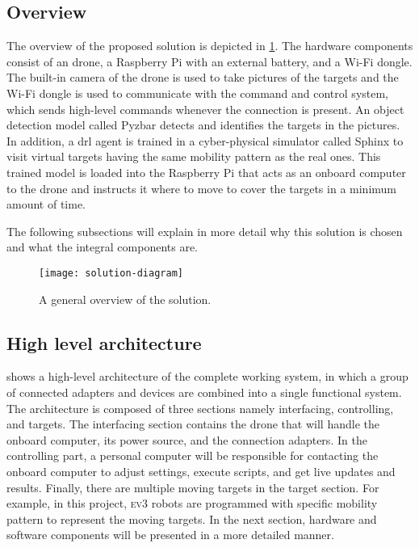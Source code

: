 \documentclass[../main.tex]{subfiles}
\begin{document}
\subsection{Overview}

The overview of the proposed solution is depicted in 
\cref{fig:solution-overview}. 
The hardware components consist of an \anafi drone,
a Raspberry Pi with an external battery, and a Wi-Fi
dongle. The built-in camera of the drone is used to
take pictures of the targets and the Wi-Fi dongle
is used to communicate with the command and control
system, which sends high-level commands whenever the
connection is present. 
An object detection model called Pyzbar detects and identifies the
targets in the pictures. 
In addition, a \gls{drl} agent is trained 
in a cyber-physical simulator called Sphinx to
visit virtual targets having the same mobility pattern as the
real ones.
This trained model is loaded into the Raspberry Pi that acts
as an onboard computer to the \anafi drone and instructs
it where to move to cover the targets in a minimum amount
of time.

The following subsections will
explain in more detail why this solution is chosen
and what the integral components are.

\begin{figure}[H]
	\centering
	\texttt{[image: solution-diagram]}
	\caption{A general overview of the solution.}
	\label{fig:solution-overview}
\end{figure}

\subsection{High level architecture}

 shows a high-level architecture 
of the complete working system, in which a group 
of connected adapters and devices are combined into 
a single functional system. 
The architecture is composed of three sections namely
interfacing, controlling, and targets. 
The interfacing section contains the drone that 
will handle the onboard computer, its power source, 
and the connection adapters. 
In the controlling part, a personal computer 
will be responsible for contacting the onboard computer 
to adjust settings, execute scripts, and get 
live updates and results. 
Finally, there are multiple moving targets 
in the target section. For example, 
in this project, \textsc{ev}3 robots are programmed with specific
mobility pattern to represent the moving targets.
In the next section, hardware and software components 
will be presented in a more detailed manner.
\end{document}
